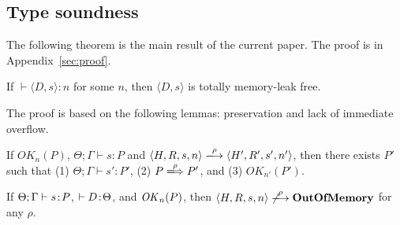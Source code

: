 \subsection{Type soundness}


The following theorem is the main result of the current paper.  The
proof is in Appendix~\ref{sec:proof}.

\begin{theorem}\label{thm1}
If $\vdash \langle D, s \rangle : n$ for some \(n\), then \(\langle D,
s \rangle\) is totally memory-leak free.
\end{theorem}


The proof is based on the following lemmas: preservation and lack of
immediate overflow.

\begin{lemma}[Preservation]
\label{lem:preservation}
If $OK_{n}(P)$, $\Theta; \Gamma \vdash s : P$ and $\langle H,R,s,n
\rangle \xlongrightarrow{\rho} \langle H',R',s', n' \rangle$, then
there exists $P'$ such that (1) $ \Theta; \Gamma \vdash s' : P'$, (2)
\(P \xLongrightarrow{\rho} P'\), and (3) \(OK_{n'}(P')\).
\end{lemma}


\begin{lemma}
\label{lem:immediateSafety}
If $\Theta; \Gamma \vdash s \!:\! P$, \(\vdash D \!:\! \Theta\), and
\(\mathit{OK}_n(P)\), then $\langle H, R, s, n \rangle
\not\xlongrightarrow{\rho} \OVERFLOW$ for any \(\rho\).
\end{lemma}

